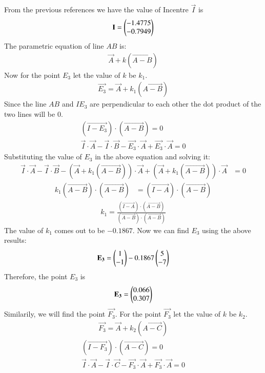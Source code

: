 \documentclass[journal,12pt,twocolumn]{IEEEtran}
\theoremstyle{remark}
\begin{document}
From the previous references we have the value of Incentre $\vec{I}$ is
\begin{align}
\mathbf{I}=\begin{pmatrix}-1.4775\\-0.7949\end{pmatrix}
\end{align}
The parametric equation of line $AB$ is:
\begin{align}
\vec{A}+k(\vec{A-B})
\end{align}
Now for the point $E_3$ let the value of $k$ be $k_1$. 
\begin{align}
\vec{E_3}=\vec{A}+k_1(\vec{A-B})
\end{align}
Since the line $AB$ and $IE_3$ are perpendicular to each other the dot product of the two lines will be 0.
\begin{align}
(\vec{I-E_3})\cdot(\vec{A-B})=0\\
\vec{I}\cdot\vec{A}-\vec{I}\cdot\vec{B}-\vec{E_3}\cdot\vec{A}+\vec{E_3}\cdot\vec{A}=0
\end{align}
Substituting the value of $E_3$ in the above equation and solving it:
\begin{align}
\vec{I}\cdot\vec{A}-\vec{I}\cdot\vec{B}-(\vec{A}+k_1(\vec{A-B}))\cdot\vec{A}+(\vec{A}+k_1(\vec{A-B}))\cdot\vec{A} &= 0 
\end{align}
\begin{align}
k_1(\vec{A-B})\cdot(\vec{A-B}) &= (\vec{I-A})\cdot(\vec{A-B})
\end{align}
\begin{align}
k_1=\frac{(\vec{I-A})\cdot(\vec{A-B})}{(\vec{A-B})\cdot(\vec{A-B})}
\end{align}
The value of $k_1$ comes out to be $-0.1867$.
Now we can find $E_3$ using the above results:
\begin{align}
\mathbf{E_3}=\begin{pmatrix}1\\-1\end{pmatrix}-0.1867\begin{pmatrix}5\\-7\end{pmatrix}
\end{align}
Therefore, the point $E_3$ is
\begin{align}
\mathbf{E_3}=\begin{pmatrix}0.066\\0.307\end{pmatrix}
\end{align}
Similarily, we will find the point $\vec{F_3}$. For the point $\vec{F_3}$ let the value of $k$ be $k_2$. 
\begin{align}
\vec{F_3}=\vec{A}+k_2(\vec{A-C})
\end{align}
\begin{align}
(\vec{I-F_3})\cdot(\vec{A-C})=0\\
\vec{I}\cdot\vec{A}-\vec{I}\cdot\vec{C}-\vec{F_3}\cdot\vec{A}+\vec{F_3}\cdot\vec{A}=0
\end{align}
\end{document}
